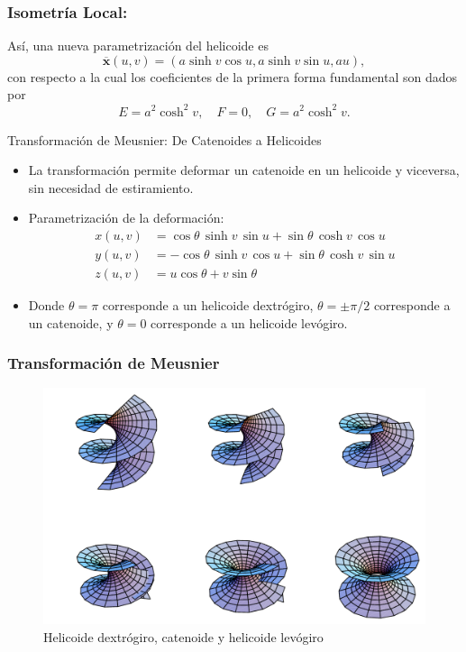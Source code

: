 \documentclass[10pt]{beamer}
\begin{document}
  \begin{frame}
    \frametitle{Isometría Local: }
    Así, una nueva parametrización del helicoide es
    \[
    \overline{\mathbf{x}}(u, v)=(a \sinh v \cos u, a \sinh v \sin u, a u),
    \]
    con respecto a la cual los coeficientes de la primera forma fundamental son dados por
    \[
    E=a^2 \cosh ^2 v, \quad F=0, \quad G=a^2 \cosh ^2 v .
    \]
    \end{frame}
  \begin{frame}{Transformación de Meusnier: De Catenoides a Helicoides}
    \begin{itemize}
        \item La transformación permite deformar un catenoide en un helicoide y viceversa, sin necesidad de estiramiento.
        \item Parametrización de la deformación:
    \begin{align*}
    x(u,v)&=\cos \theta \,\sinh v\,\sin u+\sin \theta \,\cosh v\,\cos u\\
    y(u,v)&=-\cos \theta \,\sinh v\,\cos u+\sin \theta \,\cosh v\,\sin u\\
    z(u,v)&=u\cos \theta +v\sin \theta
    \end{align*}
        \item Donde $\theta =\pi$ corresponde a un helicoide dextrógiro, $\theta =\pm \pi /2$ corresponde a un catenoide, y $\theta =0$ corresponde a un helicoide levógiro.
    \end{itemize}
    \end{frame}
    \begin{frame}
      \frametitle{Transformación de Meusnier}
      \begin{figure}
      \includegraphics[scale=0.2]{imagenes/3}
      \caption{Helicoide dextrógiro, catenoide y helicoide levógiro}
      \end{figure}
      \end{frame}
\end{document}
